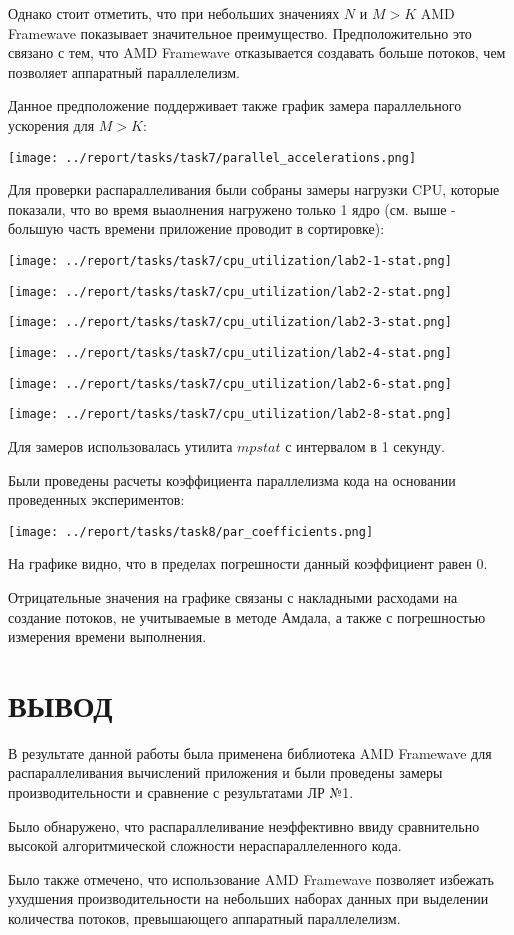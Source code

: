 \documentclass[14pt, a4paper, oneside, final]{extarticle}
\begin{document}
Однако стоит отметить, что при небольших значениях $N$ и $M > K$ AMD Framewave показывает значительное преимущество. Предположительно это связано с тем, что AMD Framewave отказывается создавать больше потоков, чем позволяет аппаратный параллелелизм.

Данное предположение поддерживает также график замера параллельного ускорения для $M > K$:

\texttt{[image: ../report/tasks/task7/parallel\_accelerations.png]}

Для проверки распараллеливания были собраны замеры нагрузки CPU, которые показали, что во время выаолнения нагружено только 1 ядро (см. выше - большую часть времени приложение проводит в сортировке):

\texttt{[image: ../report/tasks/task7/cpu\_utilization/lab2-1-stat.png]}

\texttt{[image: ../report/tasks/task7/cpu\_utilization/lab2-2-stat.png]}

\texttt{[image: ../report/tasks/task7/cpu\_utilization/lab2-3-stat.png]}

\texttt{[image: ../report/tasks/task7/cpu\_utilization/lab2-4-stat.png]}

\texttt{[image: ../report/tasks/task7/cpu\_utilization/lab2-6-stat.png]}

\texttt{[image: ../report/tasks/task7/cpu\_utilization/lab2-8-stat.png]}

Для замеров использовалась утилита $mpstat$ с интервалом в 1 секунду.

Были проведены расчеты коэффициента параллелизма кода на основании проведенных экспериментов:

\texttt{[image: ../report/tasks/task8/par\_coefficients.png]}

На графике видно, что в пределах погрешности данный коэффициент равен 0.

Отрицательные значения на графике связаны с накладными расходами на создание потоков, не учитываемые в методе Амдала, а также с погрешностью измерения времени выполнения.

\clearpage
\section*{ВЫВОД}
В результате данной работы была применена библиотека AMD Framewave для распараллеливания вычислений приложения и были проведены замеры производительности и сравнение с результатами ЛР №1.

Было обнаружено, что распараллеливание неэффективно ввиду сравнительно высокой алгоритмической сложности нераспараллеленного кода.

Было также отмечено, что использование AMD Framewave позволяет избежать ухудшения производительности на небольших наборах данных при выделении количества потоков, превышающего аппаратный параллелелизм.
\end{document}
